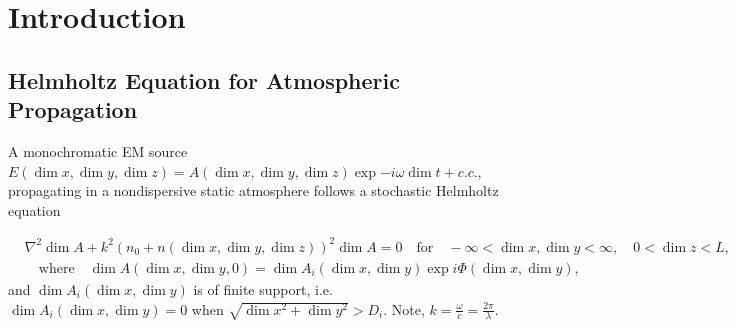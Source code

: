 \section{Introduction}\label{sec:Introduction_and_Background}


\subsection{Helmholtz Equation for  Atmospheric Propagation}

A monochromatic EM source $E(\dim{x},\dim{y},\dim{z}) = A(\dim{x},\dim{y},\dim{z})\exp{-i\omega \dim{t}} + c.c.$, 
propagating in a nondispersive static atmosphere follows a stochastic Helmholtz equation

\begin{equation}
\begin{split}
  &\nabla^2 \dim{A} + k^2  (n_0 +  n(\dim{x},\dim{y},\dim{z}))^2 \dim{A} = 0 \quad  \mbox{for}   
  \quad -\infty < \dim{x},\dim{y} < \infty, \quad 0 < \dim{z} < L, \\
  &\quad  \mbox{where} \quad \dim{A}(\dim{x},\dim{y},0) = \dim{A}_{i}(\dim{x},\dim{y})\exp{i \Phi(\dim{x},\dim{y})},
\end{split}
\end{equation}
and $\dim{A}_{i}(\dim{x},\dim{y})$ is of finite support, i.e. $\dim{A}_{i}(\dim{x},\dim{y}) = 0$ 
when $\sqrt{\dim{x}^2 + \dim{y}^2} > D_{i}$. Note, $k = \frac{\omega}{c} = \frac{2\pi}{\lambda}$.  





